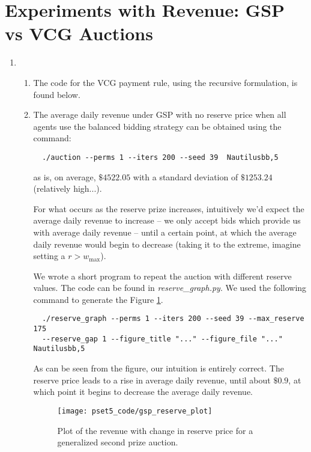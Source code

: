\documentclass[11pt]{article}
\begin{document}
\section*{Experiments with Revenue: GSP vs VCG Auctions}
\begin{enumerate}[resume]
\item 
  \begin{enumerate}
  \item The code for the VCG payment rule, using the recursive formulation, is found below. 
  
  
  \item 
  The average daily revenue under GSP with no reserve price when all agents use the balanced bidding strategy can be obtained using the command:
  \begin{lstlisting}
  ./auction --perms 1 --iters 200 --seed 39  Nautilusbb,5
  \end{lstlisting}
  as is, on average, $\$4522.05$ with a standard deviation of $\$1253.24$ (relatively high...).

  For what occurs as the reserve prize increases, intuitively we'd expect the average daily revenue to increase -- we only accept bids which provide us with average daily revenue -- until a certain point, at which the average daily revenue would begin to decrease (taking it to the extreme, imagine setting a $r > w_{\text{max}}$).

  We wrote a short program to repeat the auction with different reserve values. The code can be found in {\it reserve\_graph.py}. We used the following command to generate the Figure \ref{fig:gps_plot}.

  \begin{lstlisting}
  ./reserve_graph --perms 1 --iters 200 --seed 39 --max_reserve 175 
  --reserve_gap 1 --figure_title "..." --figure_file "..." Nautilusbb,5
  \end{lstlisting}
  As can be seen from the figure, our intuition is entirely correct. The reserve price leads to a rise in average daily revenue, until about $\$0.9$, at which point it begins to decrease the average daily revenue.

  \begin{figure}[h!]
  \centering
    \texttt{[image: pset5\_code/gsp\_reserve\_plot]}
    \caption{Plot of the revenue with change in reserve price for a generalized second prize auction.}
    \label{fig:gps_plot}
  \end{figure}


\end{enumerate}
\end{enumerate}
\end{document}
